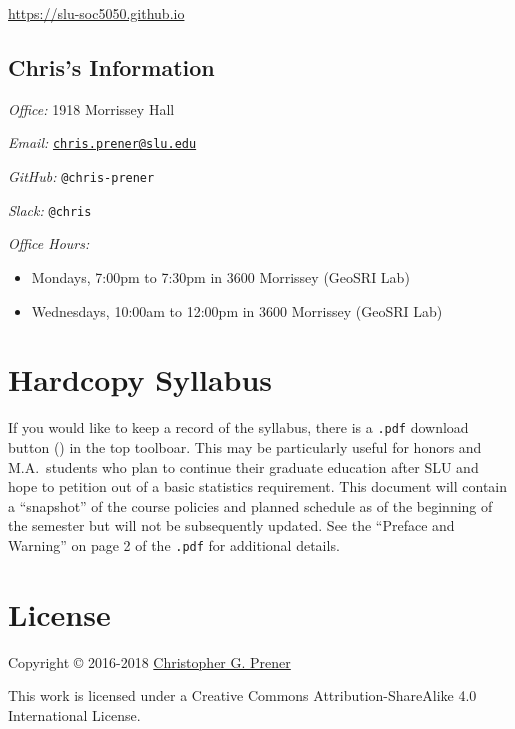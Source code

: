 \documentclass[]{book}
\theoremstyle{definition}
\theoremstyle{definition}
\theoremstyle{definition}
\theoremstyle{remark}
\begin{document}
\url{https://slu-soc5050.github.io}

\hypertarget{chriss-information}{%
\subsection*{Chris's Information}\label{chriss-information}}

\emph{Office:} 1918 Morrissey Hall

\emph{Email:}
\href{mailto:chris.prener@slu.edu}{\nolinkurl{chris.prener@slu.edu}}

\emph{GitHub:} \texttt{@chris-prener}

\emph{Slack:} \texttt{@chris}

\emph{Office Hours:}

\begin{itemize}
\item
  Mondays, 7:00pm to 7:30pm in 3600 Morrissey (GeoSRI Lab)
\item
  Wednesdays, 10:00am to 12:00pm in 3600 Morrissey (GeoSRI Lab)
\end{itemize}

\hypertarget{hardcopy-syllabus}{%
\section*{Hardcopy Syllabus}\label{hardcopy-syllabus}}

If you would like to keep a record of the syllabus, there is a
\texttt{.pdf} download button () in the top toolboar. This may be
particularly useful for honors and M.A.~students who plan to continue
their graduate education after SLU and hope to petition out of a basic
statistics requirement. This document will contain a ``snapshot'' of the
course policies and planned schedule as of the beginning of the semester
but will not be subsequently updated. See the ``Preface and Warning'' on
page 2 of the \texttt{.pdf} for additional details.

\hypertarget{license}{%
\section*{License}\label{license}}

Copyright © 2016-2018 \href{https://chris-prener.github.io}{Christopher
G. Prener}

This work is licensed under a Creative Commons Attribution-ShareAlike
4.0 International License.
\end{document}
